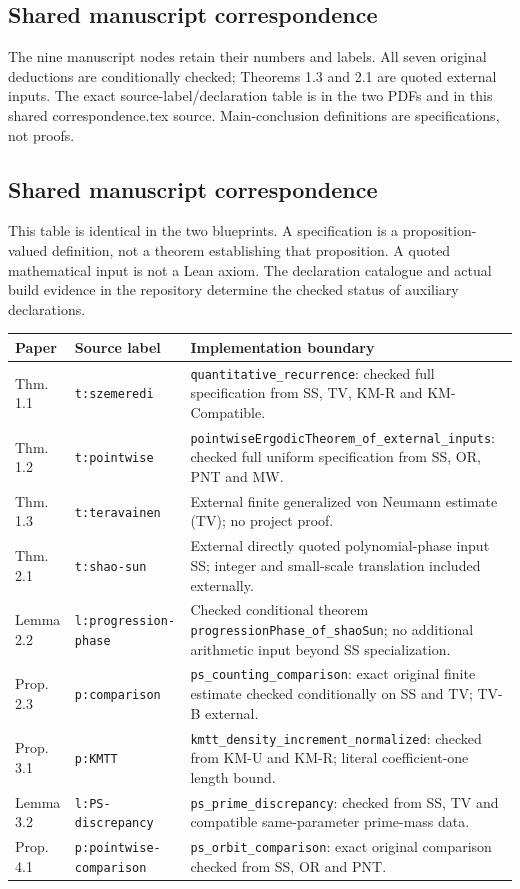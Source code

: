 \ifdefined\WebVersion
\subsection*{Shared manuscript correspondence}
The nine manuscript nodes retain their numbers and labels. All seven original deductions are conditionally checked; Theorems 1.3 and 2.1 are quoted external inputs. The exact source-label/declaration table is in the two PDFs and in this shared correspondence.tex source. Main-conclusion definitions are specifications, not proofs.
\else
\subsection*{Shared manuscript correspondence}
This table is identical in the two blueprints. A specification is a proposition-valued definition, not a theorem establishing that proposition. A quoted mathematical input is not a Lean axiom. The declaration catalogue and actual build evidence in the repository determine the checked status of auxiliary declarations.
\small
\begin{longtable}{@{}p{18mm}p{41mm}p{86mm}@{}}
\toprule Paper & Source label & Implementation boundary\\\midrule\endhead
Thm. 1.1 & \texttt{t:szemeredi} & \texttt{quantitative\_recurrence}: checked full specification from SS, TV, KM-R and KM-Compatible.\\
Thm. 1.2 & \texttt{t:pointwise} & \texttt{pointwiseErgodicTheorem\_of\_external\_inputs}: checked full uniform specification from SS, OR, PNT and MW.\\
Thm. 1.3 & \texttt{t:teravainen} & External finite generalized von Neumann estimate (TV); no project proof.\\
Thm. 2.1 & \texttt{t:shao-sun} & External directly quoted polynomial-phase input SS; integer and small-scale translation included externally.\\
Lemma 2.2 & \texttt{l:progression-phase} & Checked conditional theorem \texttt{progressionPhase\_of\_shaoSun}; no additional arithmetic input beyond SS specialization.\\
Prop. 2.3 & \texttt{p:comparison} & \texttt{ps\_counting\_comparison}: exact original finite estimate checked conditionally on SS and TV; TV-B external.\\
Prop. 3.1 & \texttt{p:KMTT} & \texttt{kmtt\_density\_increment\_normalized}: checked from KM-U and KM-R; literal coefficient-one length bound.\\
Lemma 3.2 & \texttt{l:PS-discrepancy} & \texttt{ps\_prime\_discrepancy}: checked from SS, TV and compatible same-parameter prime-mass data.\\
Prop. 4.1 & \texttt{p:pointwise-comparison} & \texttt{ps\_orbit\_comparison}: exact original comparison checked from SS, OR and PNT.\\
\bottomrule
\end{longtable}
